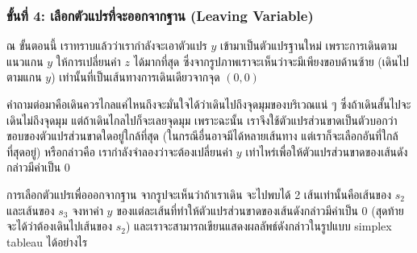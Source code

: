 \newpage

\subsubsection*{ขั้นที่ 4: เลือกตัวแปรที่จะออกจากฐาน (Leaving Variable)}

\begin{center}
\end{center}

ณ ขั้นตอนนี้ เราทราบแล้วว่าเรากำลังจะเอาตัวแปร $y$ เข้ามาเป็นตัวแปรฐานใหม่ เพราะการเดินตามแนวแกน $y$ ให้การเปลี่ยนค่า $z$ ได้มากที่สุด
ซึ่งจากรูปภาพเราจะเห็นว่าจะมีเพียงขอบด้านซ้าย (เดินไปตามแกน $y$) เท่านั้นที่เป็นเส้นทางการเดินเดียวจากจุด $(0,0)$

คำถามต่อมาคือเดินควรไกลแค่ไหนถึงจะมั่นใจได้ว่าเดินไปถึงจุดมุมของบริเวณแน่ ๆ
ซึ่งถ้าเดินสั้นไปจะเดินไม่ถึงจุดมุม แต่ถ้าเดินไกลไปก็จะเลยจุดมุม
เพราะฉะนั้น เราจึงใช้ตัวแปรส่วนขาดเป็นตัวบอกว่าขอบของตัวแปรส่วนขาดใดอยู่ใกล้ที่สุด (ในกรณีอื่นอาจมีได้หลายเส้นทาง แต่เราก็จะเลือกอันที่ใกล้ที่สุดอยู่)
หรือกล่าวคือ เรากำลังจำลองว่าจะต้องเปลี่ยนค่า $y$ เท่าไหร่เพื่อให้ตัวแปรส่วนขาดของเส้นดังกล่าวมีค่าเป็น 0
\begin{example}
    {การเลือกตัวแปรเพื่อออกจากฐาน}{}
    จากรูปจะเห็นว่าถ้าเราเดิน จะไปพบได้ 2 เส้นเท่านั้นคือเส้นของ $s_2$ และเส้นของ $s_3$ จงหาค่า $y$ ของแต่ละเส้นที่ทำให้ตัวแปรส่วนขาดของเส้นดังกล่าวมีค่าเป็น 0 (สุดท้ายจะได้ว่าต้องเดินไปเส้นของ $s_2$)
    และเราจะสามารถเขียนแสดงผลลัพธ์ดังกล่าวในรูปแบบ simplex tableau ได้อย่างไร 
\end{example}
\newpage

